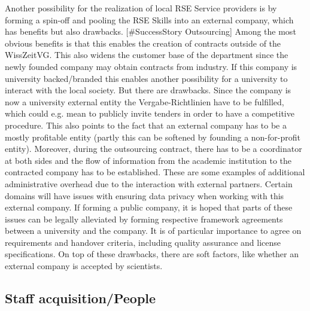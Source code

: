 \documentclass[a4paper]{article}
\begin{document}
Another possibility for the realization of local RSE Service providers is by forming a spin-off and pooling the RSE Skills into an external company, which has benefits but also drawbacks. [\#SuccessStory Outsourcing]
Among the most obvious benefits is that this enables the creation of contracts outside of the WissZeitVG.
This also widens the customer base of the department since the newly founded company may obtain contracts from industry.
If this company is university backed/branded this enables another possibility for a university to interact with the local society. 
But there are drawbacks.
Since the company is now a university external entity the Vergabe-Richtlinien have to be fulfilled, which could e.g. mean to publicly invite tenders in order to have a competitive procedure.
This also points to the fact that an external company has to be a mostly profitable entity (partly this can be softened by founding a non-for-profit entity).
Moreover, during the outsourcing contract, there has to be a coordinator at both sides and the flow of information from the academic institution to the contracted company has to be established.
These are some examples of additional administrative overhead due to the interaction with external partners.
Certain domains will have issues with ensuring data privacy when working with this external company.
If forming a public company, it is hoped that parts of these issues can be legally alleviated by forming respective framework agreements between a university and the company.
It is of particular importance to agree on requirements and handover criteria, including quality assurance and license specifications.
On top of these drawbacks, there are soft factors, like whether an external company is accepted by scientists.

\subsection{Staff acquisition/People}
\end{document}
